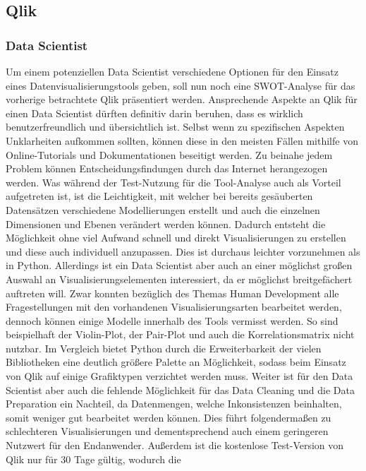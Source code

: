\documentclass[12pt]{article}
\begin{document}
	\subsection{Qlik}
	
	\subsubsection{Data Scientist}
	
	Um einem potenziellen Data Scientist verschiedene Optionen für den Einsatz eines
	Datenvisualisierungstools geben, soll nun noch eine SWOT-Analyse für das vorherige
	betrachtete Qlik präsentiert werden.
	Ansprechende Aspekte an Qlik für einen Data Scientist dürften definitiv darin beruhen,
	dass es wirklich benutzerfreundlich und übersichtlich ist. Selbst wenn zu spezifischen
	Aspekten Unklarheiten aufkommen sollten, können diese in den meisten Fällen mithilfe
	von Online-Tutorials und Dokumentationen beseitigt werden. Zu beinahe jedem Problem
	können Entscheidungsfindungen durch das Internet herangezogen werden.
	Was während der Test-Nutzung für die Tool-Analyse auch als Vorteil aufgetreten ist, ist
	die Leichtigkeit, mit welcher bei bereits gesäuberten Datensätzen verschiedene
	Modellierungen erstellt und auch die einzelnen Dimensionen und Ebenen verändert
	werden können.
	Dadurch entsteht die Möglichkeit ohne viel Aufwand schnell und direkt Visualisierungen
	zu erstellen und diese auch individuell anzupassen. Dies ist durchaus leichter
	vorzunehmen als in Python.
	Allerdings ist ein Data Scientist aber auch an einer möglichst großen Auswahl an
	Visualisierungselementen interessiert, da er möglichst breitgefächert auftreten will.
	Zwar konnten bezüglich des Themas Human Development alle Fragestellungen mit den
	vorhandenen Visualisierungsarten bearbeitet werden, dennoch können einige Modelle
	innerhalb des Tools vermisst werden. So sind beispielhaft der Violin-Plot, der Pair-Plot
	und auch die Korrelationsmatrix nicht nutzbar.
	Im Vergleich bietet Python durch die Erweiterbarkeit der vielen Bibliotheken eine
	deutlich größere Palette an Möglichkeit, sodass beim Einsatz von Qlik auf einige
	Grafiktypen verzichtet werden muss.
	Weiter ist für den Data Scientist aber auch die fehlende Möglichkeit für das Data
	Cleaning und die Data Preparation ein Nachteil, da Datenmengen, welche
	Inkonsistenzen beinhalten, somit weniger gut bearbeitet werden können. Dies führt
	folgendermaßen zu schlechteren Visualisierungen und dementsprechend auch einem
	geringeren Nutzwert für den Endanwender.
	Außerdem ist die kostenlose Test-Version von Qlik nur für 30 Tage gültig, wodurch die
\end{document}
